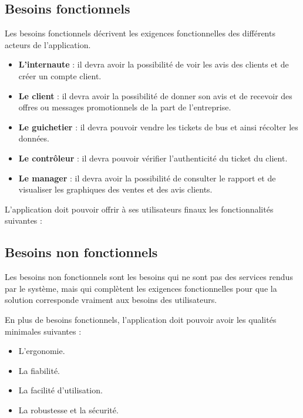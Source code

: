         \subsection{Besoins fonctionnels}
        Les besoins fonctionnels décrivent les exigences fonctionnelles
        des différents acteurs de l’application.
        \par
        \begin{itemize}
            \setlength{\itemsep}{0pt}
            \item [\ding{226}] \textbf{L’internaute} : il devra avoir la possibilité de voir
            les avis des clients et de créer un compte client. 
            \item [\ding{226}] \textbf{Le client} : il devra avoir la possibilité de
            donner son avis et de recevoir des offres ou messages promotionnels de la
            part de l’entreprise.
            \item [\ding{226}] \textbf{Le guichetier} : il devra pouvoir vendre les tickets
            de bus et ainsi récolter les données.
            \item [\ding{226}] \textbf{Le contrôleur} : il devra pouvoir vérifier l’authenticité
            du ticket du client. 
            \item [\ding{226}] \textbf{Le manager} : il devra avoir la possibilité 
            de consulter le rapport et de visualiser les graphiques des ventes et
            des avis clients. 
        \end{itemize}
        \par
        L’application doit pouvoir offrir à ses utilisateurs finaux les fonctionnalités suivantes :
        \subsection{Besoins non fonctionnels}
        Les besoins non fonctionnels sont les besoins qui ne sont pas des
        services rendus par le système, mais qui complètent les
        exigences fonctionnelles pour que la solution corresponde vraiment
        aux besoins des utilisateurs.
        \par
        En plus de besoins fonctionnels, l’application doit pouvoir avoir les qualités minimales
        suivantes :
        \begin{itemize}
            \setlength{\itemsep}{0pt}
            \item [\ding{226}] L’ergonomie.
            \item [\ding{226}] La fiabilité.
            \item [\ding{226}] La facilité d’utilisation.
            \item [\ding{226}] La robustesse et la sécurité.
        \end{itemize}
